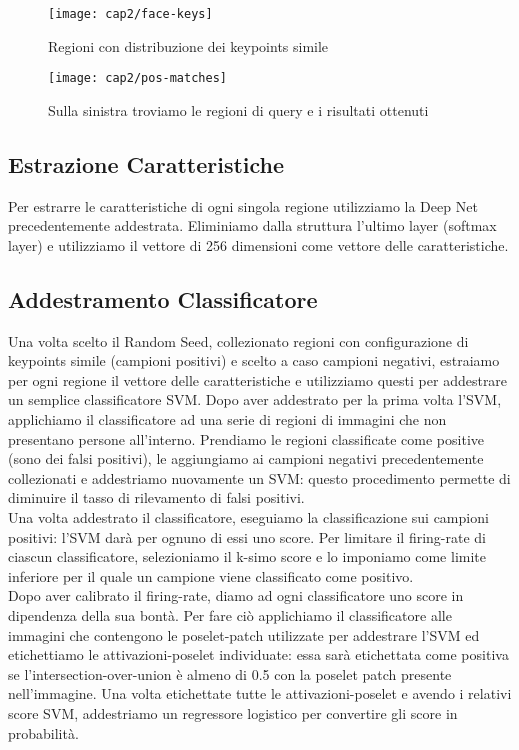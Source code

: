 \begin{figure}[h]
\centering
\texttt{[image: cap2/face-keys]}
\caption{Regioni con distribuzione dei keypoints simile}
\label{}
\end{figure}

\begin{figure}[h]
\centering
\texttt{[image: cap2/pos-matches]}
\caption{Sulla sinistra troviamo le regioni di query e i risultati ottenuti}
\label{}
\end{figure}

\subsection{Estrazione Caratteristiche}
Per estrarre le caratteristiche di ogni singola regione utilizziamo la Deep Net precedentemente addestrata. Eliminiamo dalla struttura l'ultimo layer (softmax layer) e utilizziamo il vettore di 256 dimensioni come vettore delle caratteristiche.

\subsection{Addestramento Classificatore}
Una volta scelto il Random Seed, collezionato regioni con configurazione di keypoints simile (campioni positivi) e scelto a caso campioni negativi, estraiamo per ogni regione il vettore delle caratteristiche e utilizziamo questi per addestrare un semplice classificatore SVM. Dopo aver addestrato per la prima volta l'SVM, applichiamo il classificatore ad una serie di regioni di immagini che non presentano persone all'interno. Prendiamo le regioni classificate come positive (sono dei falsi positivi), le aggiungiamo ai campioni negativi precedentemente collezionati e addestriamo nuovamente un SVM: questo procedimento permette di diminuire il tasso di rilevamento di falsi positivi.\\
Una volta addestrato il classificatore, eseguiamo la classificazione sui campioni positivi: l'SVM darà per ognuno di essi uno score. Per limitare il firing-rate di ciascun classificatore, selezioniamo il k-simo score e lo imponiamo come limite inferiore per il quale un campione viene classificato come positivo.\\
Dopo aver calibrato il firing-rate, diamo ad ogni classificatore uno score in dipendenza della sua bontà. Per fare ciò applichiamo il classificatore alle immagini che contengono le poselet-patch utilizzate per addestrare l'SVM ed etichettiamo le attivazioni-poselet individuate: essa sarà etichettata come positiva se l'intersection-over-union è almeno di 0.5 con la poselet patch presente nell'immagine. Una volta etichettate tutte le attivazioni-poselet e avendo i relativi score SVM, addestriamo un regressore logistico per convertire gli score in probabilità.

